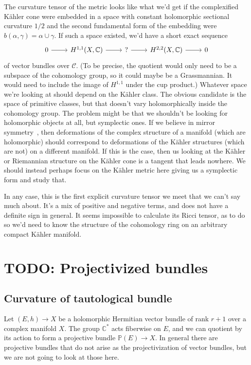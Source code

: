 \documentclass[10pt,a4paper]{article}
\newcommand{\kk}[1]{\mathbb{#1}}
\newcommand{\cc}[1]{\mathcal{#1}}
\begin{document}
The curvature tensor of the metric looks like what we'd get if the complexified K\"ahler cone were embedded in a space with constant holomorphic sectional curvature $1/2$ and the second fundamental form of the embedding were $b(\alpha,\gamma) = \alpha \cup \gamma$. If such a space existed, we'd have a short exact sequence
\[
\begin{tikzcd}
0 \ar[r] &
H^{1,1}(X,\kk C) \ar[r] &
? \ar[r] &
H^{2,2}(X,\kk C) \ar[r] &
0
\end{tikzcd}
\]
of vector bundles over $\cc C$. (To be precise, the quotient would only need to be a subspace of the cohomology group, so it could maybe be a Grassmannian. It would need to include the image of $H^{1,1}$ under the cup product.) Whatever space we're looking at should depend on the K\"ahler class. The obvious candidate is the space of primitive classes, but that doesn't vary holomorphically inside the cohomology group. The problem might be that we shouldn't be looking for holomorphic objects at all, but symplectic ones. If we believe in mirror symmetry~\cite{hori2003mirror}, then deformations of the complex structure of a manifold (which are holomorphic) should correspond to deformations of the K\"ahler structures (which are not) on a different manifold. If this is the case, then us looking at the K\"ahler or Riemannian structure on the K\"ahler cone is a tangent that leads nowhere. We should instead perhaps focus on the K\"ahler metric here giving us a symplectic form and study that.

In any case, this is the first explicit curvature tensor we meet that we can't say much about. It's a mix of positive and negative terms, and does not have a definite sign in general. It seems impossible to calculate its Ricci tensor, as to do so we'd need to know the structure of the cohomology ring on an arbitrary compact K\"ahler manifold.







\section{TODO: Projectivized bundles}



\subsection{Curvature of tautological bundle}

Let $(E, h) \to X$ be a holomorphic Hermitian vector bundle of rank $r + 1$ over a complex manifold $X$. The group $\kk C^*$ acts fiberwise on $E$, and we can quotient by its action to form a projective bundle $\kk P(E) \to X$. In general there are projective bundles that do not arise as the projectivization of vector bundles, but we are not going to look at those here.
\end{document}
